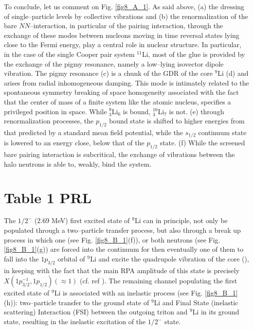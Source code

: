 \begin{subappendices}
To conclude, let us comment on Fig. \ref{fig8_A_1}. As said above, (a) the dressing of single--particle levels by collective vibrations and (b) the renormalization of the bare $NN$--interaction, in particular of the pairing interaction, through the exchange of these modes between nucleons moving in time reversal states lying close to the Fermi energy, play a central role in nuclear structure. In particular, in the case of the single Cooper pair system $^{11}$Li, most of the glue is provided by the exchange of the pigmy resonance, namely a low--lying isovector dipole vibration. The pigmy resonance (c) is a chunk of the GDR of the core $^9$Li (d) and arises from radial inhomogeneous damping. This mode is intimately related to the spontaneous symmetry breaking of space homogeneity associated with the fact that the center of mass of a finite system like the atomic nucleus, specifies a privileged position in space. While $^9_3$Li$_6$ is bound, $^{10}_3$Li$_7$ is not. (e) through renormalization processes, the $p_{1/2}$ bound state is shifted to higher energies from that predicted by a standard mean field potential, while the $s_{1/2}$ continuum state is lowered to an energy close,  below that of the $p_{1/2}$ state. (f) While the screened bare pairing interaction is subcritical, the exchange of vibrations between the halo neutrons is able to, weakly, bind the system.






\section{Table 1 PRL}\label{C8AppB}
The $1/2^-$ (2.69 MeV) first excited state of $^9$Li can in principle, not only be populated through a two--particle transfer process, but also through a break up process in which one (see Fig. \ref{fig8_B_1}(f)), or both neutrons (see Fig. \ref{fig8_B_1}(g)) are forced into the continuum for then eventually one of them to fall into the $1p_{3/2}$ orbital of $^9$Li and excite the quadrupole vibration of the core (\cite{Potel:10}), in keeping with the fact that the main RPA amplitude of this state is precisely $X(1p^{-1}_{3/2},1p_{1/2})(\approx 1)$ (cf. ref \cite{Barranco:01}). The remaining channel populating the first excited state of $^9$Li is associated with an inelastic process (see Fig. \ref{fig8_B_1}(h)): two--particle transfer to the ground state of $^{9}$Li and Final State (inelastic scattering) Interaction (FSI) between the outgoing triton and $^{9}$Li in its ground state, resulting in the inelastic excitation of  the $1/2^-$ state.



\end{subappendices}
